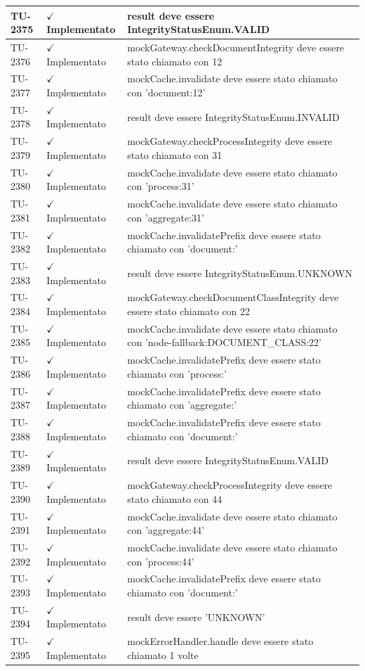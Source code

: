 ﻿\documentclass[a4paper,12pt]{article}
\newcommand{\ok}{\textcolor{green!60!black}{$\checkmark$ Implementato}}
\begin{document}
\begin{longtable}{|p{2cm}|p{3.5cm}|p{9.5cm}|}
\hline
TU-2375 & \ok & result deve essere IntegrityStatusEnum.VALID \\
\hline
TU-2376 & \ok & mockGateway.checkDocumentIntegrity deve essere stato chiamato con 12 \\
\hline
TU-2377 & \ok & mockCache.invalidate deve essere stato chiamato con 'document:12' \\
\hline
TU-2378 & \ok & result deve essere IntegrityStatusEnum.INVALID \\
\hline
TU-2379 & \ok & mockGateway.checkProcessIntegrity deve essere stato chiamato con 31 \\
\hline
TU-2380 & \ok & mockCache.invalidate deve essere stato chiamato con 'process:31' \\
\hline
TU-2381 & \ok & mockCache.invalidate deve essere stato chiamato con 'aggregate:31' \\
\hline
TU-2382 & \ok & mockCache.invalidatePrefix deve essere stato chiamato con 'document:' \\
\hline
TU-2383 & \ok & result deve essere IntegrityStatusEnum.UNKNOWN \\
\hline
TU-2384 & \ok & mockGateway.checkDocumentClassIntegrity deve essere stato chiamato con 22 \\
\hline
TU-2385 & \ok & mockCache.invalidate deve essere stato chiamato con 'node-fallback:DOCUMENT\_CLASS:22' \\
\hline
TU-2386 & \ok & mockCache.invalidatePrefix deve essere stato chiamato con 'process:' \\
\hline
TU-2387 & \ok & mockCache.invalidatePrefix deve essere stato chiamato con 'aggregate:' \\
\hline
TU-2388 & \ok & mockCache.invalidatePrefix deve essere stato chiamato con 'document:' \\
\hline
TU-2389 & \ok & result deve essere IntegrityStatusEnum.VALID \\
\hline
TU-2390 & \ok & mockGateway.checkProcessIntegrity deve essere stato chiamato con 44 \\
\hline
TU-2391 & \ok & mockCache.invalidate deve essere stato chiamato con 'aggregate:44' \\
\hline
TU-2392 & \ok & mockCache.invalidate deve essere stato chiamato con 'process:44' \\
\hline
TU-2393 & \ok & mockCache.invalidatePrefix deve essere stato chiamato con 'document:' \\
\hline
TU-2394 & \ok & result deve essere 'UNKNOWN' \\
\hline
TU-2395 & \ok & mockErrorHandler.handle deve essere stato chiamato 1 volte \\

\end{longtable}
\end{document}

